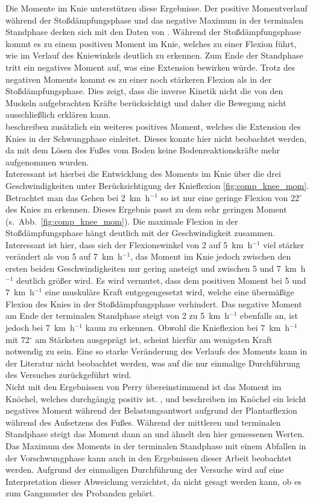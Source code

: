 Die Momente im Knie unterstützen diese Ergebnisse. Der positive Momentverlauf während der Stoßdämpfungsphase und das negative Maximum in der terminalen Standphase decken sich mit den Daten von \textcite{perry2010gait}. Während der Stoßdämpfungsphase kommt es zu einem positiven Moment im Knie, welches zu einer Flexion führt, wie im Verlauf des Kniewinkels deutlich zu erkennen. Zum Ende der Standphase tritt ein negatives Moment auf, was eine Extension bewirken würde. Trotz des negativen Moments kommt es zu einer noch stärkeren Flexion als in der Stoßdämpfungsphase. Dies zeigt, dass die inverse Kinetik nicht die von den Muskeln aufgebrachten Kräfte berücksichtigt und daher die Bewegung nicht ausschließlich erklären kann.\\
\textcite{perry2010gait} beschreiben zusätzlich ein weiteres positives Moment, welches die Extension des Knies in der Schwungphase einleitet. Dieses konnte hier nicht beobachtet werden, da mit dem Lösen des Fußes vom Boden keine Bodenreaktionskräfte mehr aufgenommen wurden.\\
Interessant ist hierbei die Entwicklung des Moments im Knie über die drei Geschwindigkeiten unter Berücksichtigung der Knieflexion \ref{fig:comp_knee_mom}. Betrachtet man das Gehen bei 2~km~h$^{-1}$ so ist nur eine geringe Flexion von 22$^{\circ}$ des Knies zu erkennen. Dieses Ergebnis passt zu dem sehr geringen Moment (s.~Abb.~\ref{fig:comp_knee_mom}). Die maximale Flexion in der Stoßdämpfungsphase hängt deutlich mit der Geschwindigkeit zusammen. Interessant ist hier, dass sich der Flexionswinkel von 2 auf 5~km~h$^{-1}$  viel stärker verändert als von 5 auf 7~km~h$^{-1}$, das Moment im Knie jedoch zwischen den ersten beiden Geschwindigkeiten nur gering ansteigt und zwischen 5 und 7~km~h$^{-1}$ deutlich größer wird. Es wird vermutet, dass dem positiven Moment bei 5 und 7~km~h$^{-1}$ eine muskuläre Kraft entgegengesetzt wird, welche eine übermäßige Flexion des Knies in der Stoßdämpfungsphase verhindert. Das negative Moment am Ende der terminalen Standphase steigt von 2 zu 5~km~h$^{-1}$ ebenfalls an, ist jedoch bei 7~km~h$^{-1}$ kaum zu erkennen. Obwohl die Knieflexion bei 7~km~h$^{-1}$ mit 72$^{\circ}$ am Stärksten ausgeprägt ist, scheint hierfür am wenigsten Kraft notwendig zu sein. Eine so starke Veränderung des Verlaufs des Moments kann in der Literatur nicht beobachtet werden, was auf die nur einmalige Durchführung des Versuches zurückgeführt wird.\\
Nicht mit den Ergebnissen von Perry übereinstimmend ist das Moment im Knöchel, welches durchgängig positiv ist. \textcite{perry2010gait}, \textcite{eng1995kinetic} und \textcite{lay2006effects} beschreiben im Knöchel ein leicht negatives Moment während der Belastungsantwort aufgrund der Plantarflexion während des Aufsetzens des Fußes. Während der mittleren und terminalen Standphase steigt das Moment dann an und ähnelt den hier gemessenen Werten. Das Maximum des Moments in der terminalen Standphase mit einem Abfallen in der Vorschwungphase kann auch in den Ergebnissen dieser Arbeit beobachtet werden. Aufgrund der einmaligen Durchführung der Versuche wird auf eine Interpretation dieser Abweichung verzichtet, da nicht gesagt werden kann, ob es zum Gangmuster des Probanden gehört.\\
